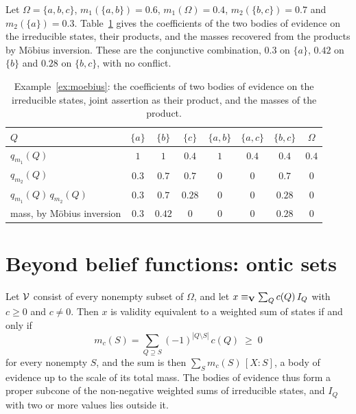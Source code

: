 \begin{example}\label{ex:moebius}
Let $\Omega = \{a, b, c\}$, $m_1(\{a,b\}) = 0.6$, $m_1(\Omega) = 0.4$, $m_2(\{b,c\}) = 0.7$ and $m_2(\{a\}) = 0.3$. Table~\ref{tab:moebius} gives the coefficients of the two bodies of evidence on the irreducible states, their products, and the masses recovered from the products by M\"obius inversion. These are the conjunctive combination, $0.3$ on $\{a\}$, $0.42$ on $\{b\}$ and $0.28$ on $\{b, c\}$, with no conflict.
\end{example}

\begin{table}[ht]
\centering\small
\begin{tabular}{@{}lccccccc@{}}
\toprule
$Q$ & $\{a\}$ & $\{b\}$ & $\{c\}$ & $\{a,b\}$ & $\{a,c\}$ & $\{b,c\}$ & $\Omega$\\
\midrule
$q_{m_1}(Q)$ & $1$ & $1$ & $0.4$ & $1$ & $0.4$ & $0.4$ & $0.4$\\
$q_{m_2}(Q)$ & $0.3$ & $0.7$ & $0.7$ & $0$ & $0$ & $0.7$ & $0$\\
$q_{m_1}(Q)\,q_{m_2}(Q)$ & $0.3$ & $0.7$ & $0.28$ & $0$ & $0$ & $0.28$ & $0$\\
mass, by M\"obius inversion & $0.3$ & $0.42$ & $0$ & $0$ & $0$ & $0.28$ & $0$\\
\bottomrule
\end{tabular}
\caption{\small Example~\ref{ex:moebius}: the coefficients of two bodies of evidence on the irreducible states, joint assertion as their product, and the masses of the product.}
\label{tab:moebius}
\end{table}

\section{Beyond belief functions: ontic sets}\label{sec:ontic}

\begin{proposition}\label{prop:cone}
Let $\mathcal{V}$ consist of every nonempty subset of $\Omega$, and let $x \equiv_{\mathbf{V}} \sum_Q c(Q)\, I_Q$ with $c \geq 0$ and $c \neq 0$. Then $x$ is validity equivalent to a weighted sum of states if and only if
\[
m_c(S) = \sum_{Q \supseteq S} (-1)^{|Q \setminus S|}\, c(Q) \;\geq\; 0
\]
for every nonempty $S$, and the sum is then $\sum_S m_c(S)\,[X:S]$, a body of evidence up to the scale of its total mass. The bodies of evidence thus form a proper subcone of the non-negative weighted sums of irreducible states, and $I_Q$ with two or more values lies outside it.
\end{proposition}

